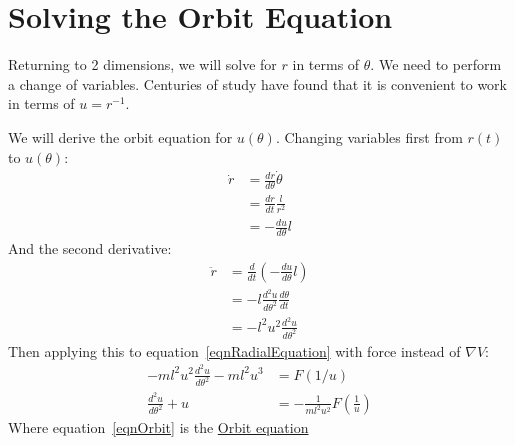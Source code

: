 \documentclass[../Main.tex]{subfiles}
\begin{document}
\section{Solving the Orbit Equation}
Returning to 2 dimensions, we will solve for $r$ in terms of $\theta$. We need to perform a change of variables. Centuries of study have found that it is convenient to work in terms of $u = r^{-1}$.\par
We will derive the orbit equation for $u(\theta)$. Changing variables first from $r(t)$ to $u(\theta)$:
\begin{align*}
    \dot{r} &= \frac{dr}{d\theta} \dot{\theta} \\
    &= \frac{dr}{dt}\frac{l}{r^2}\\
    &= -\frac{du}{d\theta} l
\end{align*}
And the second derivative:
\begin{align*}
    \ddot{r} &= \frac{d}{dt}\left(-\frac{du}{d\theta}l\right) \\
    &= -l\frac{d^2u}{d\theta^2}\frac{d\theta}{dt} \\
    &= -l^2 u^2 \frac{d^2u}{d\theta^2}
\end{align*}
Then applying this to equation~\ref{eqnRadialEquation} with force instead of $\nabla V$:
\begin{align}
    -ml^2 u^2 \frac{d^2u}{d\theta^2} - ml^2 u^3 &= F\left(1/u\right) \nonumber \\
    \frac{d^2u}{d\theta^2} + u &= -\frac{1}{ml^2u^2} F\left(\frac{1}{u}\right) \label{eqnOrbit}
\end{align}
Where equation~\ref{eqnOrbit} is the \underline{Orbit equation}\par
\end{document}

